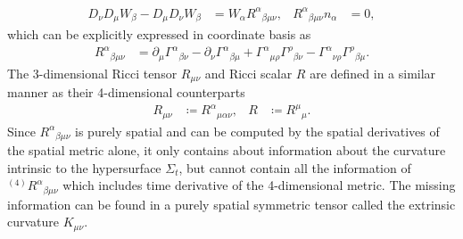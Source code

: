 \begin{align}
    D_{\nu} D_{\mu} W_\beta - D_{\mu} D_{\nu} W_\beta &= W_\alpha R^\alpha{}_{\beta\mu\nu}, & R^{\alpha}{}_{\beta\mu\nu} n_\alpha &= 0,
\end{align}
which can be explicitly expressed in coordinate basis as
\begin{align}
    R^{\alpha}{}_{\beta\mu\nu} &= \partial_{\mu} \Gamma^{\alpha}{}_{\beta\nu} - \partial_{\nu} \Gamma^{\alpha}{}_{\beta\mu} + \Gamma^{\alpha}{}_{\mu\rho}\Gamma^{\rho}{}_{\beta\nu} - \Gamma^{\alpha}{}_{\nu\rho}\Gamma^{\rho}{}_{\beta\mu}.
\end{align}
The 3-dimensional Ricci tensor $R_{\mu\nu}$ and Ricci scalar $R$ are defined in a similar manner as their 4-dimensional counterparts
\begin{align}
     R_{\mu\nu} &\coloneqq  R^\alpha{}_{\mu\alpha\nu}, & R &\coloneqq  R^{\mu}{}_{\mu}.
\end{align}
Since $R^{\alpha}{}_{\beta\mu\nu}$ is purely spatial and can be computed by the spatial derivatives of the spatial metric alone,
it only contains about information about the curvature intrinsic to the hypersurface $\Sigma_t$,
but cannot contain all the information of ${}^{(4)} R^{\alpha}{}_{\beta\mu\nu}$ which includes time derivative of the 4-dimensional metric.
The missing information can be found in a purely spatial symmetric tensor called the extrinsic curvature $K_{\mu\nu}$.

